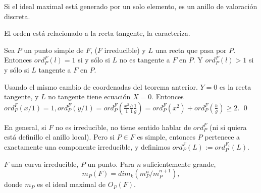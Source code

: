 \begin{nota}
Si el ideal maximal está generado por un solo elemento, es un anillo de valoración discreta. 
\end{nota}


\begin{nota}
El orden está relacionado a la recta tangente, la caracteriza. 
\end{nota}

\begin{Cor}
Sea $P$ un punto simple de $F$, ($F$ irreducible) y $L$ una recta que pasa por $P$. Entonces $ord_P^F(l)=1$ si y sólo si $L$ no es tangente a $F$ en $P$. Y $ord^F_P(l)>1$ si y sólo si $L$ tangente a $F$ en $P$. 
\end{Cor}

\begin{Dem}
Usando el mismo cambio de coordenadas del teorema anterior. $Y=0$ es la recta tangente, y $L$ no tangente tiene ecuación $X=0$. Entonces $ord_P^F(x/1)=1, ord_P^F(y/1)=ord_P^F(\frac{x^2}{1}\frac{h}{1}\frac{1}{g})= ord_P^F(x^2)+ord_P^F(\frac{h}{g}) \ge 2$.  \qed
\end{Dem}

\begin{nota}
En general, si $F$ no es irreducible, no tiene sentido hablar de $ord_P^F$ (ni si quiera está definillo el anillo local). Pero si $P\in F$ es simple, entonces $P$ pertenece a exactamente una componente irreducible, y definimos $ord_P^F(L):= ord_P^{F_i}(L)$.
\end{nota}

\begin{Teo}
$F$ una curva irreducible, $P$ un punto. Para $n$ suficientemente grande, $$m_P(F)=dim_k(m_P^n/m_P^{n+1}),$$
donde $m_P$ es el ideal maximal de $O_P(F)$. 
\end{Teo}

